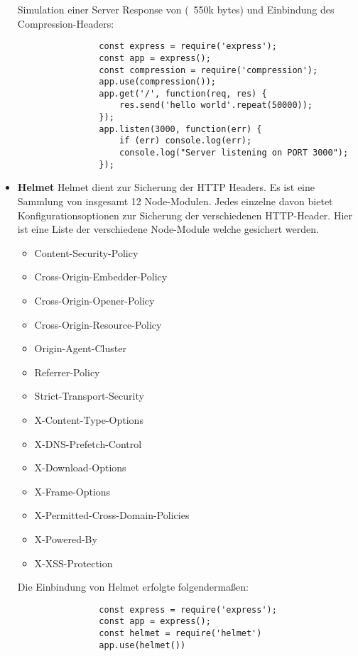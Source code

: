 \begin{itemize}
        Simulation einer Server Response von (~550k bytes) und Einbindung des Compression-Headers:
            \begin{lstlisting}
                const express = require('express');
                const app = express();
                const compression = require('compression');
                app.use(compression());
                app.get('/', function(req, res) {
                    res.send('hello world'.repeat(50000));
                });
                app.listen(3000, function(err) {
                    if (err) console.log(err);
                    console.log("Server listening on PORT 3000");
                });
            \end{lstlisting}
    \item \textbf{Helmet}
        \newline
        Helmet dient zur Sicherung der HTTP Headers. Es ist eine Sammlung von insgesamt 12 Node-Modulen. Jedes einzelne davon bietet Konfigurationsoptionen zur Sicherung der verschiedenen HTTP-Header. Hier ist eine Liste der verschiedene Node-Module welche gesichert werden.
        \begin{itemize}
            \item Content-Security-Policy
            \item Cross-Origin-Embedder-Policy
            \item Cross-Origin-Opener-Policy
            \item Cross-Origin-Resource-Policy
            \item Origin-Agent-Cluster
            \item Referrer-Policy
            \item Strict-Transport-Security
            \item X-Content-Type-Options
            \item X-DNS-Prefetch-Control
            \item X-Download-Options
            \item X-Frame-Options
            \item X-Permitted-Cross-Domain-Policies
            \item X-Powered-By
            \item X-XSS-Protection
        \end{itemize}

        Die Einbindung von Helmet erfolgte folgendermaßen:

            \begin{lstlisting}
                const express = require('express');
                const app = express();
                const helmet = require('helmet')
                app.use(helmet())
            \end{lstlisting}


\end{itemize}
